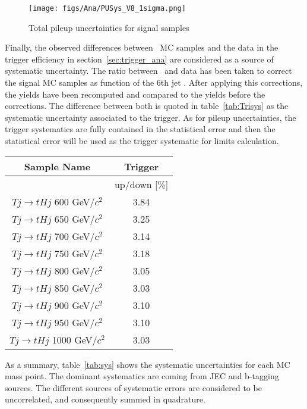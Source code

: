 \begin{figure}[!Hhtbp]
  \begin{center}
    \texttt{[image: figs/Ana/PUSys\_V8\_1sigma.png]}
    \caption{Total pileup uncertainties for signal samples}
    \label{fig:TotalPUSys}
  \end{center}
\end{figure}

Finally, the observed differences between \ttbar~MC samples and the data in the trigger efficiency in section~\ref{sec:trigger_ana} are considered as a source of systematic uncertainty. The ratio between \ttbar~and data has been taken to correct the signal MC samples as function of the 6th jet \pt. After applying this corrections, the yields have been recomputed and compared to the yields before the corrections. The difference between both is quoted in table~\ref{tab:Trisys} as the systematic uncertainty associated to the trigger. As for pileup uncertainties, the trigger systematics are fully contained in the statistical error and then the statistical error will be used as the trigger systematic for limits calculation.

\begin{table*}[htbH]
\begin{center}
\begin{tabular}{|c|c|}
\hline 
Sample Name & Trigger \\
\hline
 & up/down [\%] \\
\hline
$Tj\rightarrow tHj$ 600 GeV/$c^{2}$ & 3.84 \\
$Tj\rightarrow tHj$ 650 GeV/$c^{2}$ & 3.25 \\
$Tj\rightarrow tHj$ 700 GeV/$c^{2}$ & 3.14 \\
$Tj\rightarrow tHj$ 750 GeV/$c^{2}$ & 3.18 \\
$Tj\rightarrow tHj$ 800 GeV/$c^{2}$ & 3.05 \\
$Tj\rightarrow tHj$ 850 GeV/$c^{2}$ & 3.03 \\
$Tj\rightarrow tHj$ 900 GeV/$c^{2}$ & 3.10 \\
$Tj\rightarrow tHj$ 950 GeV/$c^{2}$ & 3.10 \\
$Tj\rightarrow tHj$ 1000 GeV/$c^{2}$ & 3.03 \\
\hline
\end{tabular}
\caption{Trigger uncertainties for signal samples\label{tab:Trisys}}
\end{center}
\end{table*}

As a summary, table~\ref{tab:sys} shows the systematic uncertainties for each MC mass point. The dominant systematics are coming from JEC and b-tagging sources. The different sources of systematic errors are considered to be uncorrelated, and consequently summed in quadrature. %

